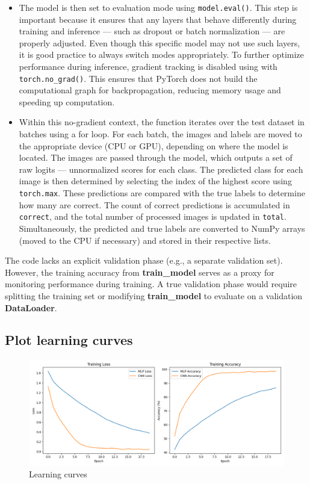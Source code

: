 \documentclass[a4paper,12pt]{article}
\begin{document}
\begin{itemize}
\begin{itemize}
        \item The model is then set to evaluation mode using \verb|model.eval()|. This step is important because it ensures that any layers that behave differently during training and inference — such as dropout or batch normalization — are properly adjusted. Even though this specific model may not use such layers, it is good practice to always switch modes appropriately. To further optimize performance during inference, gradient tracking is disabled using with \verb|torch.no_grad()|. This ensures that PyTorch does not build the computational graph for backpropagation, reducing memory usage and speeding up computation.
        
        \item Within this no-gradient context, the function iterates over the test dataset in batches using a for loop. For each batch, the images and labels are moved to the appropriate device (CPU or GPU), depending on where the model is located. The images are passed through the model, which outputs a set of raw logits — unnormalized scores for each class. The predicted class for each image is then determined by selecting the index of the highest score using \verb|torch.max|. These predictions are compared with the true labels to determine how many are correct. The count of correct predictions is accumulated in \verb|correct|, and the total number of processed images is updated in \verb|total|. Simultaneously, the predicted and true labels are converted to NumPy arrays (moved to the CPU if necessary) and stored in their respective lists.
    \end{itemize}
\end{itemize}

The code lacks an explicit validation phase (e.g., a separate validation set). However, the training accuracy from \textbf{train\_model} serves as a proxy for monitoring performance during training. A true validation phase would require splitting the training set or modifying \textbf{train\_model} to evaluate on a validation \textbf{DataLoader}.

\subsection{Plot learning curves}

\begin{figure}[h]
    \centering
    \includegraphics[width=0.8\linewidth]{images/learning_curves.png}
    \caption{Learning curves}
    \label{fig:enter-label}
\end{figure}
\newpage
\end{document}
